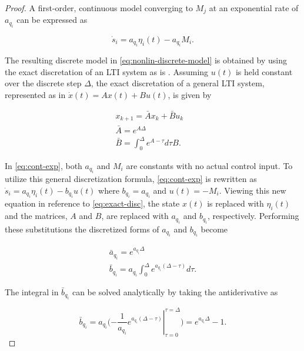\documentclass[ee,thesis]{usuthesis}
\begin{document}
\begin{proof}
A first-order, continuous model converging to $M_j$ at an exponential rate of $a_{q_i}$ can be expressed as

\begin{equation}
\label{eq:cont-exp}
\dot{s}_i = a_{q_i} \eta_i(t) - a_{q_i} M_i\text{.}
\end{equation}

The resulting discrete model in \ref{eq:nonlin-discrete-model} is obtained by using the exact discretation of an LTI system as is \cite{brogan-1990-moder-contr-theor}. Assuming $u(t)$ is held constant over the discrete step $\Delta$, the exact discretation of a general LTI system, represented as in $\dot{x}(t) = Ax(t) + Bu(t)$, is given by

\begin{equation}
\label{eq:exact-disc}
\begin{array}{ll}
x_{k+1} = \bar{A}x_k + \bar{B}u_k & \\
\bar{A} = e^{A\Delta} \\
\bar{B} = \int_0^\Delta e^{A-\tau} d\tau B\text{.}
\end{array}
\end{equation}

In \ref{eq:cont-exp}, both $a_{q_i}$ and $M_i$ are constants with no actual control input. To utilize this general discretization formula, \ref{eq:cont-exp} is rewritten as $\dot{s}_i = a_{q_i} \eta_i(t) - b_{q_i}u(t)$ where $b_{q_i} = a_{q_i}$ and $u(t) = -M_i$. Viewing this new equation in reference to \ref{eq:exact-disc}, the state $x(t)$ is replaced with $\eta_i(t)$ and the matrices, $A$ and $B$, are replaced with $a_{q_i}$ and $b_{q_i}$, respectively. Performing these substitutions the discretized forms of $a_{q_i}$ and $b_{q_i}$ become

\begin{equation}
\begin{array}{l}
\bar{a}_{q_i} = e^{a_{q_i} \Delta} \\
\bar{b}_{q_i} = a_{q_i} \int_0^\Delta e^{a_{q_i}(\Delta - \tau)} d\tau\text{.}
\end{array}
\end{equation}

The integral in $\bar{b}_{q_i}$ can be solved analytically by taking the antiderivative as

\begin{equation}
\bar{b}_{q_i} = a_{q_i} \Big( \left. -\frac{1}{a_{q_i}} e^{a_{q_i} (\Delta - \tau)} \right|_{\tau = 0}^{\tau = \Delta}\Big) = e^{a_{q_i}\Delta} - 1\text{.}
\end{equation}
\end{proof}
\end{document}
